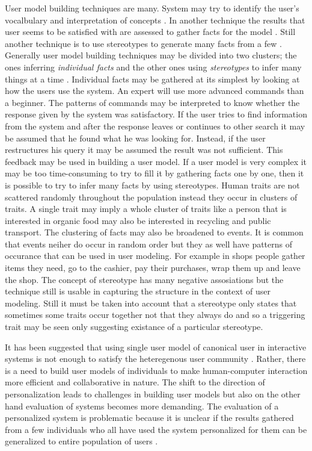\documentclass{sigchi}
\begin{document}
User model building techniques are many. System may try to identify the user's vocalbulary and interpretation of concepts \cite{rich99}. In another technique the results that user seems to be satisfied with are assessed to gather facts for the model \cite{rich99}. Still another technique is to use stereotypes to generate many facts from a few \cite{rich99}. Generally user model building techniques may be divided into two clusters; the ones inferring \textit{individual facts} and the other ones using \textit{stereotypes} to infer many things at a time \cite{rich99}. Individual facts may be gathered at its simplest by looking at how the users use the system. An expert will use more advanced commands than a beginner. The patterns of commands may be interpreted to know whether the response given by the system was satisfactory. If the user tries to find information from the system and after the response leaves or continues to other search it may be assumed that he found what he was looking for. Instead, if the user restructures his query it may be assumed the result was not sufficient. This feedback may be used in building a user model. If a user model is very complex it may be too time-consuming to try to fill it by gathering facts one by one, then it is possible to try to infer many facts by using stereotypes. Human traits are not scattered randomly throughout the population instead they occur in clusters of traits. A single trait may imply a whole cluster of traits like a person that is interested in organic food may also be interested in recycling and public transport.  The clustering of facts may also be broadened to events. It is common that events neiher do occur in random order but they as well have patterns of occurance that can be used in user modeling. For example in shops people gather items they need, go to the cashier, pay their purchases, wrap them up and leave the shop. The concept of stereotype has many negative assosiations but the technique still is usable in capturing the structure in the context of user modeling. Still it must be taken into account that a stereotype only states that sometimes some traits occur together not that they always do and so a triggering trait may be seen only suggesting existance of a particular stereotype. 

It has been suggested that using single user model of canonical user in interactive systems is not enough to satisfy the heteregenous user community \cite{rich99}. Rather, there is a need to build user models of individuals to make human-computer interaction more efficient and collaborative in nature. The shift to the direction of personalization leads to challenges in building user models but also on the other hand evaluation of systems becomes more demanding. The evaluation of a personalized system is problematic because it is unclear if the results gathered from a few individuals who all have used the system personalized for them can be generalized to entire population of users \cite{van08}.
\end{document}
